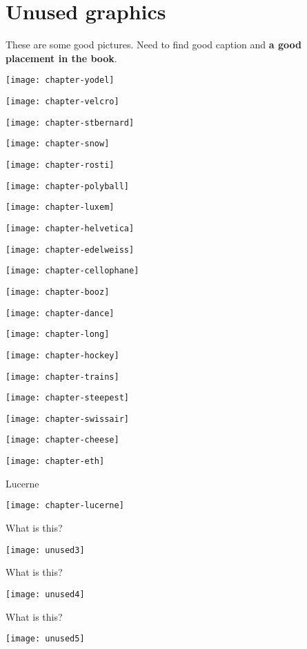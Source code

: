 \section{Unused graphics}

These are some good pictures. Need to find good caption and \textbf{a good placement in the book}.

\texttt{[image: chapter-yodel]}

\texttt{[image: chapter-velcro]}

\texttt{[image: chapter-stbernard]}

\texttt{[image: chapter-snow]}

\texttt{[image: chapter-rosti]}

\texttt{[image: chapter-polyball]}

\texttt{[image: chapter-luxem]}

\texttt{[image: chapter-helvetica]}

\texttt{[image: chapter-edelweiss]}

\texttt{[image: chapter-cellophane]}

\texttt{[image: chapter-booz]}

\texttt{[image: chapter-dance]}

\texttt{[image: chapter-long]}

\texttt{[image: chapter-hockey]}

\texttt{[image: chapter-trains]}

\texttt{[image: chapter-steepest]}

\texttt{[image: chapter-swissair]}

\texttt{[image: chapter-cheese]}

\texttt{[image: chapter-eth]}

Lucerne

\texttt{[image: chapter-lucerne]}

What is this?

\texttt{[image: unused3]}

What is this?

\texttt{[image: unused4]}

What is this?

\texttt{[image: unused5]}

